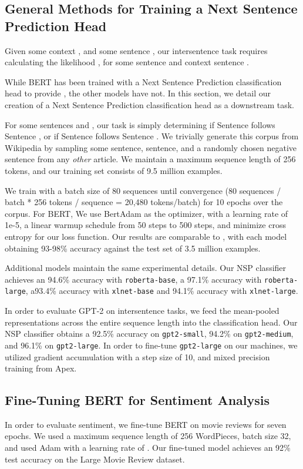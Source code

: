 \documentclass[11pt,a4paper]{article}
\begin{document}
\subsection{General Methods for Training a Next Sentence Prediction Head}
\label{NspHead}
Given some context , and some sentence , our intersentence task requires calculating the likelihood , for some sentence  and context sentence .

While BERT has been trained with a Next Sentence Prediction classification head to provide , the other models have not. In this section, we detail our creation of a Next Sentence Prediction classification head as a downstream task.

For some sentences  and , our task is simply determining if Sentence  follows Sentence , or if Sentence  follows Sentence .  We trivially generate this corpus from Wikipedia by sampling some  sentence,  sentence, and a randomly chosen negative sentence from any \textit{other} article. We maintain a maximum sequence length of 256 tokens, and our training set consists of 9.5 million examples.

We train with a batch size of 80 sequences until convergence (80 sequences / batch * 256 tokens / sequence = 20,480 tokens/batch) for 10 epochs over the corpus.
For BERT, We use BertAdam as the optimizer, with a learning rate of 1e-5, a linear warmup schedule from 50 steps to 500 steps, and minimize cross entropy for our loss function. Our results are comparable to \citet{devlin_bert_2019}, with each model obtaining 93-98\% accuracy against the test set of 3.5 million examples.

Additional models maintain the same experimental details. Our NSP classifier achieves an 94.6\% accuracy with \texttt{roberta-base}, a 97.1\% accuracy with \texttt{roberta-large}, a93.4\% accuracy with \texttt{xlnet-base} and 94.1\% accuracy with \texttt{xlnet-large}.

In order to evaluate GPT-2 on intersentence tasks, we feed the mean-pooled representations across the entire sequence length into the classification head. Our NSP classifier obtains a 92.5\% accuracy on \texttt{gpt2-small}, 94.2\% on \texttt{gpt2-medium}, and 96.1\% on \texttt{gpt2-large}. In order to fine-tune \texttt{gpt2-large} on our machines, we utilized gradient accumulation with a step size of 10, and mixed precision training from Apex. 

\subsection{Fine-Tuning BERT for Sentiment Analysis}
\label{sec:bert-sentiment}
In order to evaluate sentiment, we fine-tune BERT \cite{devlin_bert_2019} on movie reviews \cite{maas-EtAl:2011:ACL-HLT2011} for seven epochs. We used a maximum sequence length of 256 WordPieces, batch size 32, and used Adam with a learning rate of . Our fine-tuned model achieves an 92\% test accuracy on the Large Movie Review dataset.

\normalsize
\end{document}
